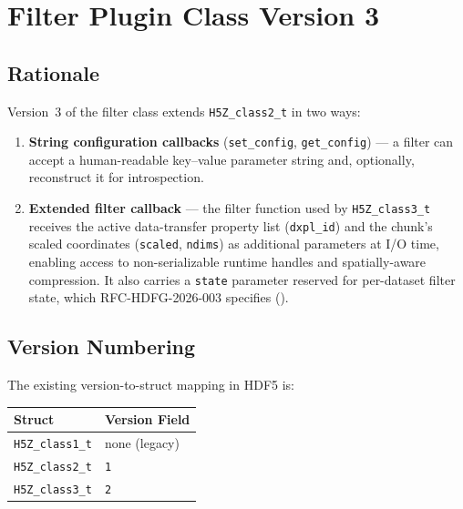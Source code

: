 \documentclass[../RFC-HDFG-2026-001.tex]{subfiles}
\begin{document}
\section{Filter Plugin Class Version 3}
\label{sec:class3}

\subsection{Rationale}

Version~3 of the filter class extends \texttt{H5Z\_class2\_t} in two
ways:

\begin{enumerate}
\item \textbf{String configuration callbacks} (\texttt{set\_config},
  \texttt{get\_config}) --- a filter can accept a human-readable
  key--value parameter string and, optionally, reconstruct it for
  introspection.

\item \textbf{Extended filter callback} --- the filter function used by
  \texttt{H5Z\_class3\_t} receives the active data-transfer property list
  (\texttt{dxpl\_id}) and the chunk's scaled coordinates (\texttt{scaled},
  \texttt{ndims}) as additional parameters at I/O time, enabling access to
  non-serializable runtime handles and spatially-aware compression.  It
  also carries a \texttt{state} parameter reserved for per-dataset filter
  state, which RFC-HDFG-2026-003 specifies ().
\end{enumerate}

\subsection{Version Numbering}
\label{sec:version-numbering}

The existing version-to-struct mapping in HDF5 is:

\begin{center}
\begin{tabular}{ll}
\toprule
\textbf{Struct} & \textbf{Version Field} \\
\midrule
\texttt{H5Z\_class1\_t} & none (legacy) \\
\texttt{H5Z\_class2\_t} & \texttt{1} \\
\texttt{H5Z\_class3\_t} & \texttt{2} \\
\bottomrule
\end{tabular}
\end{center}
\end{document}
